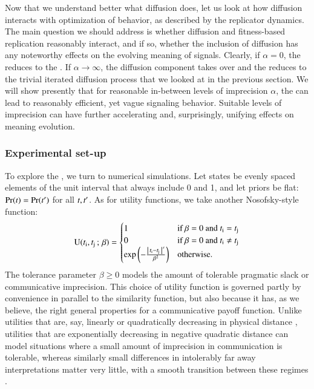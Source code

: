 \documentclass[fleqn,reqno,10pt]{article}
\newcommand{\rd}{\acro{rd}} %
\newcommand{\rdd}{\acro{rdd}} %
\newcommand{\impairment}{\ensuremath{\alpha}} %
\newcommand{\toler}{\ensuremath{\beta}} %
\begin{document}
Now that we understand better what diffusion does, let us look at how
diffusion interacts with optimization of behavior, as described by the
replicator dynamics. The main question we should address is whether
diffusion and fitness-based replication reasonably interact, and if
so, whether the inclusion of diffusion has any noteworthy effects on
the evolving meaning of signals. Clearly, if $\impairment = 0$, the
\rdd reduces to the \rd. If $\impairment \rightarrow \infty$, the
diffusion component takes over and the \rdd reduces to the trivial
iterated diffusion process that we looked at in the previous
section. We will show presently that for reasonable in-between levels
of imprecision $\impairment$, the \rdd can lead to reasonably
efficient, yet vague signaling behavior. Suitable levels of
imprecision can have further accelerating and, surprisingly, unifying
effects on meaning evolution.

\subsubsection{Experimental set-up}

To explore the \rdd, we turn to numerical simulations. Let states be
evenly spaced elements of the unit interval that always include 0 and
1, and let priors be flat: $\Pr(t) = \Pr(t')$ for all
$t, t'$. As for utility functions, we take another
Nosofsky-style function:
\begin{align*}
  \util(\mystate{i}, \mystate{j} \myts ; \myts \toler) =
      \begin{cases}
    1 & \textrm{if } \toler = 0 \textrm{ and } \mystate{i} = \mystate{j} \\
    0 & \textrm{if } \toler = 0 \textrm{ and } \mystate{i} \neq \mystate{j} \\
 \expo \left ( -  \frac{\card{\mystate{i} - \mystate{j}}^s}{ \toler^2} \right ) & \textrm{otherwise.} \\
    \end{cases}
\end{align*}
The tolerance parameter $\toler \ge 0$ models the amount of tolerable
pragmatic slack or communicative imprecision. This choice of utility
function is governed partly by convenience in parallel to the
similarity function, but also because it has, as we believe, the right
general properties for a communicative payoff function. Unlike
utilities that are, say, linearly or quadratically decreasing in
physical distance \citep[c.f.][]{JagerMetzger2011:Voronoi-Languag,FrankeJager2010:Vagueness-Signa},
utilities that are exponentially decreasing in negative quadratic
distance can model situations where a small amount of imprecision in
communication is tolerable, whereas similarly small differences in
intolerably far away interpretations matter very little, with a smooth
transition between these regimes
\citep[c.f.][]{OConnor2013:The-Evolution-o}.
\end{document}

